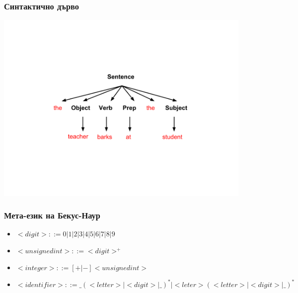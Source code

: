 \documentclass{beamer}
\begin{document}
\begin{frame}[fragile]
\frametitle{Синтактично дърво}

\begin{center}
\vspace*{-40pt}
\includegraphics[width=12.5cm]{images/stree}  
\end{center}



\end{frame}

\begin{frame}[fragile]
\frametitle{Мета-език на Бекус-Наур}

\begin{itemize}
\item $<digit> ::= 0 | 1 | 2 | 3 | 4 | 5 | 6 | 7 | 8 | 9 $
\item $<unsigned int> ::= <digit>^+$
\item $<integer> ::= [+|-] <unsigned int>$
\item $<identifier> ::= \_ (<letter> | <digit> | \_ )^* | <leter> (<letter> | <digit> | \_ )^* $
\end{itemize}

\end{frame}
\end{document}
